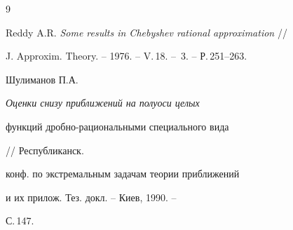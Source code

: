 \begin{thebibliography}{9} 


 




Reddy A.R. {\em Some results in Chebyshev rational approximation} // 


J. Approxim. Theory. -- 1976. -- V.\,18. -- \No\,3. -- Р.\,251--263. 




Шулиманов П.А. {\em Оценки снизу приближений на полуоси целых  


функций дроб\-но-рациональными специального вида} // Республиканск. 


конф. по экстремальным задачам теории приближений 


и их прилож. Тез. докл. -- Киев, 1990. -- 


С.\,147. 


 


\end{thebibliography} 


 


\vskip 2cm 


 






 


\label{end} 


 


